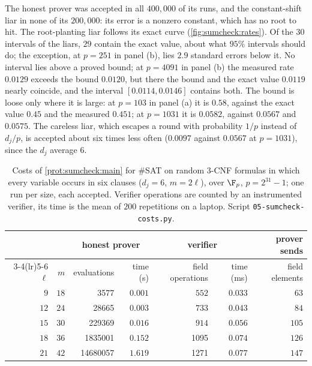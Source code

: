\begin{refsection}
The honest prover was accepted in all $400{,}000$ of its runs, and the constant-shift liar in none of its $200{,}000$: its error is a nonzero constant, which has no root to hit. The root-planting liar follows its exact curve (\cref{fig:sumcheck:rates}). Of the $30$ intervals of the liars, $29$ contain the exact value, about what $95\%$ intervals should do; the exception, at $p=251$ in panel (b), lies $2.9$ standard errors below it. No interval lies above a proved bound; at $p=4091$ in panel (b) the measured rate $0.0129$ exceeds the bound $0.0120$, but there the bound and the exact value $0.0119$ nearly coincide, and the interval $[0.0114,0.0146]$ contains both. The bound is loose only where it is large: at $p=103$ in panel (a) it is $0.58$, against the exact value $0.45$ and the measured $0.451$; at $p=1031$ it is $0.0582$, against $0.0567$ and $0.0575$. The careless liar, which escapes a round with probability $1/p$ instead of $d_j/p$, is accepted about six times less often ($0.0097$ against $0.0567$ at $p=1031$), since the $d_j$ average $6$.

\begin{table}[t]
\centering\small
\begin{tabular}{@{}r r r r r r r@{}}
\toprule
& & \multicolumn{2}{c}{honest prover} & \multicolumn{2}{c}{verifier} & prover sends\\
\cmidrule(lr){3-4}\cmidrule(lr){5-6}
$\ell$ & $m$ & evaluations & time (s) & field operations & time (ms) & field elements\\
\midrule
$9$ & $18$ & \num{3577} & $0.001$ & $552$ & $0.033$ & $63$\\
$12$ & $24$ & \num{28665} & $0.003$ & $733$ & $0.043$ & $84$\\
$15$ & $30$ & \num{229369} & $0.016$ & $914$ & $0.056$ & $105$\\
$18$ & $36$ & \num{1835001} & $0.152$ & \num{1095} & $0.074$ & $126$\\
$21$ & $42$ & \num{14680057} & $1.619$ & \num{1271} & $0.077$ & $147$\\
\bottomrule
\end{tabular}
\caption{Costs of \cref{prot:sumcheck:main} for $\#$SAT on random 3-CNF formulas in which every variable occurs in six clauses ($d_j=6$, $m=2\ell$), over $\F_p$, $p=2^{31}-1$; one run per size, each accepted. Verifier operations are counted by an instrumented verifier, its time is the mean of $200$ repetitions on a laptop. Script \texttt{05-sumcheck-costs.py}.}\label{tab:sumcheck:costs}
\end{table}


\end{refsection}
